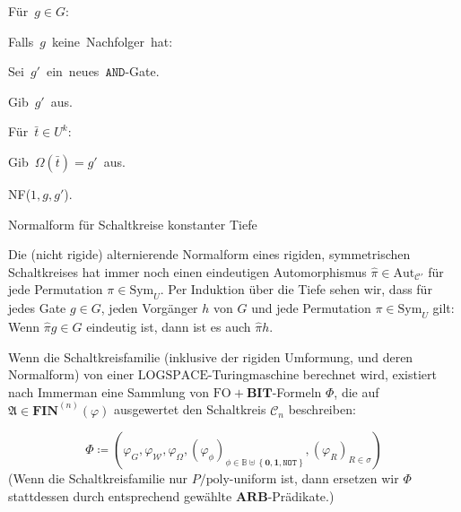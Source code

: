\begin{algorithm}
\begin{lyxcode}
\begin{lyxcode}
Für~$g\in G$:~

\begin{lyxcode}
Falls~$g$~keine~Nachfolger~hat:~

\begin{lyxcode}
Sei~$g'$~ein~neues~$\mathtt{AND}$-Gate.

Gib~$g'$~aus.

Für~$\bar{t}\in U^{k}$:~

\begin{lyxcode}
Gib~$\Omega\left(\bar{t}\right)=g'$~aus.
\end{lyxcode}
NF($1,g,g'$).
\end{lyxcode}
\end{lyxcode}
\end{lyxcode}
\end{lyxcode}
\caption{\label{alg:ac0-normal-form}Normalform für Schaltkreise konstanter
Tiefe}
\end{algorithm}

Die (nicht rigide) alternierende Normalform eines rigiden, symmetrischen
Schaltkreises hat immer noch einen eindeutigen Automorphismus $\hat{\pi}\in\mathrm{Aut}_{\mathcal{C}'}$
für jede Permutation $\pi\in\mathrm{Sym}_{U}$. Per Induktion über
die Tiefe sehen wir, dass für jedes Gate $g\in G$, jeden Vorgänger
$h$ von $G$ und jede Permutation $\pi\in\mathrm{Sym}_{U}$ gilt:
Wenn $\hat{\pi}g\in G$ eindeutig ist, dann ist es auch $\hat{\pi}h$.

Wenn die Schaltkreisfamilie (inklusive der rigiden Umformung, und
deren Normalform) von einer $\mathrm{LOGSPACE}$-Turingmaschine berechnet
wird, existiert nach Immerman\cite{immerman2012descriptive} eine
Sammlung von $\mathrm{FO}+\mathbf{BIT}$-Formeln $\Phi$, die auf
$\mathfrak{A}\in\mathbf{FIN}^{\left(n\right)}\left(\varphi\right)$
ausgewertet den Schaltkreis $\mathcal{C}_{n}$ beschreiben:

\[
\Phi\coloneqq\left(\varphi_{G},\varphi_{\mathcal{W}},\varphi_{\Omega},\left(\varphi_{\phi}\right)_{\phi\in\mathbb{B}\uplus\left\{ \mathbf{0},\mathbf{1},\mathtt{NOT}\right\} },\left(\varphi_{R}\right)_{R\in\sigma}\right)
\]
(Wenn die Schaltkreisfamilie nur $P/\mathrm{poly}$-uniform ist, dann
ersetzen wir $\Phi$ stattdessen durch entsprechend gewählte $\mathbf{ARB}$-Prädikate.)

